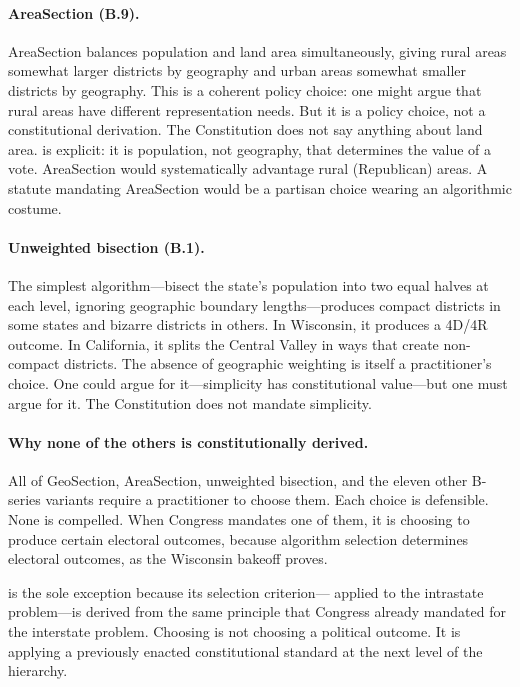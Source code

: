 \paragraph{AreaSection (B.9).}
AreaSection \citep{b9paper} balances population and land area simultaneously,
giving rural areas somewhat larger districts by geography and urban areas
somewhat smaller districts by geography.
This is a coherent policy choice: one might argue that rural areas have
different representation needs.
But it is a policy choice, not a constitutional derivation.
The Constitution does not say anything about land area.
\wesberry{} is explicit: it is population, not geography, that determines
the value of a vote.
AreaSection would systematically advantage rural (Republican) areas.
A statute mandating AreaSection would be a partisan choice wearing an
algorithmic costume.

\paragraph{Unweighted bisection (B.1).}
The simplest algorithm---bisect the state's population into two equal halves
at each level, ignoring geographic boundary lengths---produces compact
districts in some states and bizarre districts in others.
In Wisconsin, it produces a 4D/4R outcome.
In California, it splits the Central Valley in ways that create non-compact
districts.
The absence of geographic weighting is itself a practitioner's choice.
One could argue for it---simplicity has constitutional value---but one must
argue for it.
The Constitution does not mandate simplicity.

\paragraph{Why none of the others is constitutionally derived.}
All of GeoSection, AreaSection, unweighted bisection, and the eleven other
B-series variants require a practitioner to choose them.
Each choice is defensible.
None is compelled.
When Congress mandates one of them, it is choosing to produce certain
electoral outcomes, because algorithm selection determines electoral outcomes,
as the Wisconsin bakeoff proves.

\ar{} is the sole exception because its selection criterion---\hh{} applied
to the intrastate problem---is derived from the same principle that Congress
already mandated for the interstate problem.
Choosing \ar{} is not choosing a political outcome.
It is applying a previously enacted constitutional standard at the next level
of the hierarchy.

